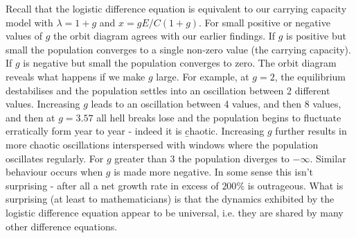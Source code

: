 Recall that the logistic difference equation is equivalent to our carrying capacity model with $\lambda = 1+g$ and $x = gE/C(1+g)$. For small positive or negative values of $g$ the orbit diagram agrees with our earlier findings. If $g$ is positive but small the population converges to a single non-zero value (the carrying capacity). If $g$ is negative but small the population converges to zero. The orbit diagram reveals what happens if we make $g$ large. For example, at $g=2$, the equilibrium destabilises and the population settles into an oscillation between 2 different values. Increasing $g$ leads to an oscillation between 4 values, and then 8 values, and then at $g=3.57$ all hell breaks lose and the population begins to fluctuate erratically form year to year - indeed it is {\b chaotic}. Increasing $g$ further results in more chaotic oscillations interspersed with windows where the population oscillates regularly. For $g$ greater than 3 the population diverges to $-\infty$. Similar behaviour occurs when $g$ is made more negative.  In some sense this isn't surprising - after all a net growth rate in excess of $200 \%$ is outrageous. What is surprising (at least to mathematicians) is that the dynamics exhibited by the logistic difference equation appear to be universal, i.e. they are shared by many other difference equations.
%
%
%
%
%
%

